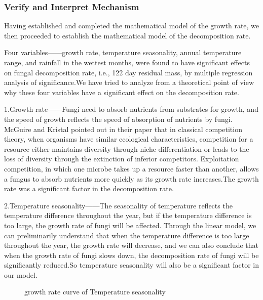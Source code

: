 \documentclass[12pt]{article}
\begin{document}

\subsubsection{Verify and Interpret Mechanism}
Having established and completed the mathematical model of the growth rate, we then proceeded to establish the mathematical model of the decomposition rate.\par

Four variables——growth rate, temperature seasonality, annual temperature range, and rainfall in the wettest months, were found to have significant effects on fungal decomposition rate, i.e., 122 day residual mass, by multiple regression analysis of significance.We have tried to analyze from a theoretical point of view why these four variables have a significant effect on the decomposition rate.\par

1.Growth rate——Fungi need to absorb nutrients from substrates for growth, and the speed of growth reflects the speed of absorption of nutrients by fungi. McGuire and Kristal pointed out in their paper that in classical competition theory\cite{4}, when organisms have similar ecological characteristics, competition for a resource either maintains diversity through niche differentiation or leads to the loss of diversity through the extinction of inferior competitors. Exploitation competition, in which one microbe takes up a resource faster than another, allows a fungus to absorb nutrients more quickly as its growth rate increases.The growth rate was a significant factor in the decomposition rate.\par

2.Temperature seasonality——The seasonality of temperature reflects the temperature difference throughout the year, but if the temperature difference is too large, the growth rate of fungi will be affected. Through the linear model, we can preliminarily understand that when the temperature difference is too large throughout the year, the growth rate will decrease, and we can also conclude that when the growth rate of fungi slows down, the decomposition rate of fungi will be significantly reduced.So temperature seasonality will also be a significant factor in our model.\par

\begin{figure}[h]
	\centering
	\caption{growth rate curve of Temperature seasonality}
	\label{figure:Temperature_Seasonality_growth_rate}
\end{figure}
\end{document}
